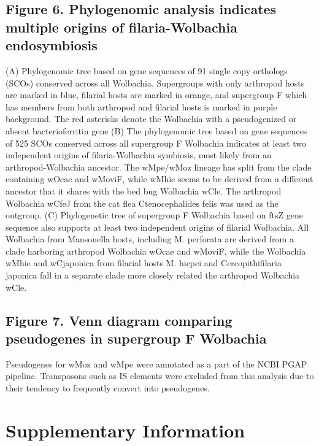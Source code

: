 \documentclass[10pt, a4paper, twocolumn]{article} %
\begin{document}
\subsection{Figure 6. Phylogenomic analysis indicates multiple origins of filaria-Wolbachia endosymbiosis}
(A) Phylogenomic tree based on gene sequences of 91 single copy orthologs (SCOs) conserved across all Wolbachia. Supergroups with only arthropod hosts are marked in blue, filarial hosts are marked in orange, and supergroup F which has members from both arthropod and filarial hosts is marked in purple background. The red asterisks denote the Wolbachia with a pseudogenized  or absent bacterioferritin gene (B) The phylogenomic tree based on gene sequences of 525 SCOs conserved across all supergroup F Wolbachia indicates at least two independent origins of filaria-Wolbachia symbiosis, most likely from an arthropod-Wolbachia ancestor. The wMpe/wMoz lineage has split from the clade containing wOcae and wMoviF, while wMhie seems to be derived from a different ancestor that it shares with the bed bug Wolbachia wCle. The arthropod Wolbachia wCfeJ from the cat flea Ctenocephalides felis was used as the outgroup. (C) Phylogenetic tree of supergroup F Wolbachia based on ftsZ gene sequence also supports at least two independent origins of filarial Wolbachia. All Wolbachia from Mansonella hosts, including M. perforata are derived from a clade harboring arthropod Wolbachia wOcae and wMoviF, while the Wolbachia wMhie and wCjaponica from filarial hosts M. hiepei and Cercopithifilaria japonica fall in a separate clade more closely related the arthropod Wolbachia wCle.

\subsection{Figure 7. Venn diagram comparing pseudogenes in supergroup F Wolbachia}
Pseudogenes for wMoz and wMpe were annotated as a part of the NCBI PGAP pipeline. Transposons such as IS elements were excluded from this analysis due to their tendency to frequently convert into pseudogenes. 


\section{Supplementary Information}
\end{document}
